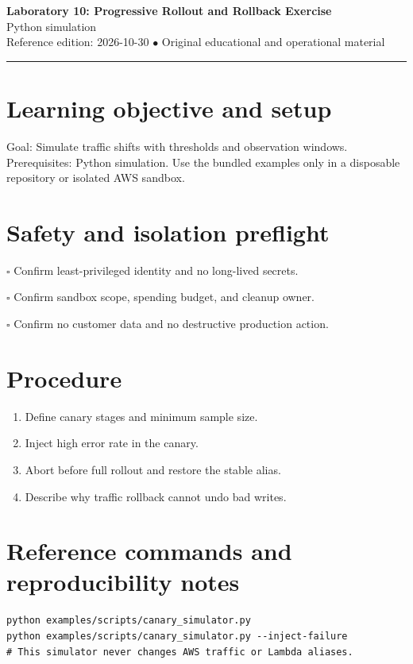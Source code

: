 \documentclass[10pt,letterpaper]{article}
\begin{document}
\begin{center}
{\LARGE\bfseries\color{cdblue}Laboratory 10: Progressive Rollout and Rollback Exercise}\\[7pt]
{\large Python simulation}\\[6pt]
{\small Reference edition: 2026-10-30 $\bullet$ Original educational and operational material}
\end{center}
\noindent\color{cdblue}\rule{\linewidth}{1.2pt}\color{black}
\vspace{0.4em}
\section{Learning objective and setup}
Goal: Simulate traffic shifts with thresholds and observation windows. Prerequisites: Python simulation. Use the bundled examples only in a disposable repository or isolated AWS sandbox.


\section{Safety and isolation preflight}
\noindent $\square$ Confirm least-privileged identity and no long-lived secrets.\par\vspace{0.35em}
\noindent $\square$ Confirm sandbox scope, spending budget, and cleanup owner.\par\vspace{0.35em}
\noindent $\square$ Confirm no customer data and no destructive production action.\par\vspace{0.35em}

\section{Procedure}
\begin{enumerate}
\item Define canary stages and minimum sample size.
\item Inject high error rate in the canary.
\item Abort before full rollout and restore the stable alias.
\item Describe why traffic rollback cannot undo bad writes.
\end{enumerate}

\section{Reference commands and reproducibility notes}
\begin{verbatim}
python examples/scripts/canary_simulator.py
python examples/scripts/canary_simulator.py --inject-failure
# This simulator never changes AWS traffic or Lambda aliases.
\end{verbatim}
\end{document}
